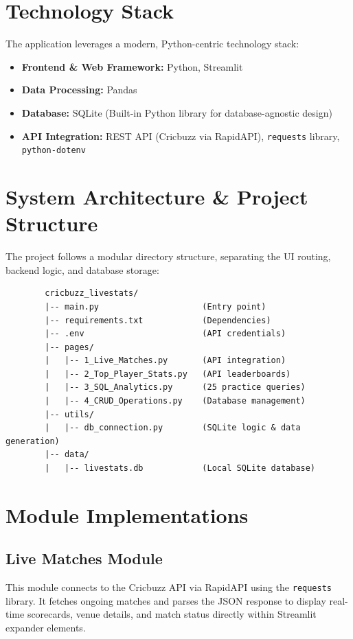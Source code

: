 \documentclass[11pt, a4paper]{article}
\begin{document}
	\section{Technology Stack}
	The application leverages a modern, Python-centric technology stack:
	\begin{itemize}
		\item \textbf{Frontend \& Web Framework:} Python, Streamlit
		\item \textbf{Data Processing:} Pandas
		\item \textbf{Database:} SQLite (Built-in Python library for database-agnostic design)
		\item \textbf{API Integration:} REST API (Cricbuzz via RapidAPI), \texttt{requests} library, \texttt{python-dotenv}
	\end{itemize}
	
	\section{System Architecture \& Project Structure}
	The project follows a modular directory structure, separating the UI routing, backend logic, and database storage:
	
	\begin{verbatim}
		cricbuzz_livestats/
		|-- main.py                     (Entry point)
		|-- requirements.txt            (Dependencies)
		|-- .env                        (API credentials)
		|-- pages/
		|   |-- 1_Live_Matches.py       (API integration)
		|   |-- 2_Top_Player_Stats.py   (API leaderboards)
		|   |-- 3_SQL_Analytics.py      (25 practice queries)
		|   |-- 4_CRUD_Operations.py    (Database management)
		|-- utils/
		|   |-- db_connection.py        (SQLite logic & data generation)
		|-- data/
		|   |-- livestats.db            (Local SQLite database)
	\end{verbatim}
	
	\section{Module Implementations}
	
	\subsection{Live Matches Module}
	This module connects to the Cricbuzz API via RapidAPI using the \texttt{requests} library. It fetches ongoing matches and parses the JSON response to display real-time scorecards, venue details, and match status directly within Streamlit expander elements.
	
\end{document}
